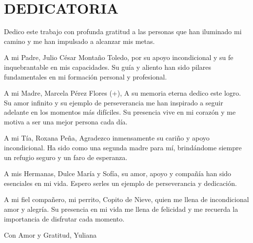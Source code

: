 \thispagestyle{plain}
\clearpage
{} 
\setcounter{page}{1}
\thispagestyle{plain}
\section*{\centering DEDICATORIA}
\justify %

Dedico este trabajo con profunda gratitud a las personas que han iluminado mi camino y me han impulsado a alcanzar mis metas. \newline

A mi Padre, Julio César Montaño Toledo, por su apoyo incondicional y su fe inquebrantable en mis capacidades. Su guía y aliento han sido pilares fundamentales en mi formación personal y profesional. \newline

A mi Madre, Marcela Pérez Flores (+), A su memoria eterna dedico este logro. Su amor infinito y su ejemplo de perseverancia me han inspirado a seguir adelante en los momentos más difíciles. Su presencia vive en mi corazón y me motiva a ser una mejor persona cada día. \newline

A mi Tía, Roxana Peña, Agradezco inmensamente su cariño y apoyo incondicional. Ha sido como una segunda madre para mí, brindándome siempre un refugio seguro y un faro de esperanza. \newline

A mis Hermanas, Dulce María y Sofía, su amor, apoyo y compañía han sido esenciales en mi vida. Espero serles un ejemplo de perseverancia y dedicación. \newline

A mi fiel compañero, mi perrito, Copito de Nieve, quien me llena de incondicional amor y alegría. Su presencia en mi vida me llena de felicidad y me recuerda la importancia de disfrutar cada momento. \newline

Con Amor y Gratitud, \newline
Yuliana